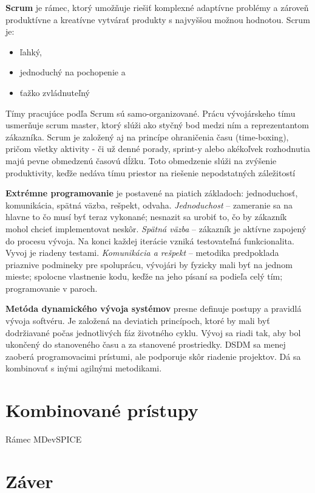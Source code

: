 \documentclass[10pt,twoside,slovak,a4paper]{article}
\begin{document}
\textbf{Scrum} je rámec, ktorý umožňuje riešiť komplexné adaptívne problémy a zároveň produktívne a kreatívne vytvárať produkty s najvyššou možnou hodnotou. Scrum je: 
\begin{itemize}
\item  ľahký,
\item jednoduchý na pochopenie a
\item ťažko zvládnuteľný
\end{itemize}
Tímy pracujúce podľa Scrum sú samo-organizované. Prácu vývojárskeho tímu usmerňuje scrum master, ktorý slúži ako styčný bod medzi ním a reprezentantom zákazníka. Scrum je založený aj na princípe ohraničenia času (time-boxing), pričom všetky aktivity - či už denné porady, sprint-y alebo akékoľvek rozhodnutia majú pevne obmedzenú časovú dĺžku. Toto obmedzenie slúži na zvýšenie produktivity, keďže nedáva tímu priestor na riešenie nepodstatných záležitostí\cite{scrum}

\textbf{Extrémne programovanie} je postavené na piatich základoch: jednoduchosť, komunikácia, spätná väzba, rešpekt, odvaha.
\emph{Jednoduchost} – zameranie sa na hlavne to čo musí byť teraz vykonané; nesnazit sa urobiť to, čo by zákazník mohol chcieť implementovat neskôr.
\emph{Spätná väzba} – zákazník je aktívne zapojený do procesu vývoja. Na konci každej iterácie vzniká testovateľná funkcionalita. Vyvoj je riadeny testami. 
\emph{Komunikácia a rešpekt} – metodika predpoklada priaznive podmineky pre spoluprácu, vývojári by fyzicky mali byť na jednom mieste; spolocne vlastnenie kodu, keďže na jeho písaní sa podieľa celý tím; programovanie v paroch.

\textbf{Metóda dynamického vývoja systémov} presne definuje postupy a pravidlá vývoja softvéru. Je založená na deviatich princípoch, ktoré by mali byť dodržiavané počas jednotlivých fáz životného cyklu. Vývoj sa riadi tak, aby bol ukončený do stanoveného času a za stanovené prostriedky. DSDM sa menej zaoberá programovacimi prístumi, ale podporuje skôr riadenie projektov. Dá sa kombinovať s inými agilnými metodikami.

\section{Kombinované prístupy}
Rámec MDevSPICE\cite{mccaffery2019}

\section{Záver}



\end{document}
